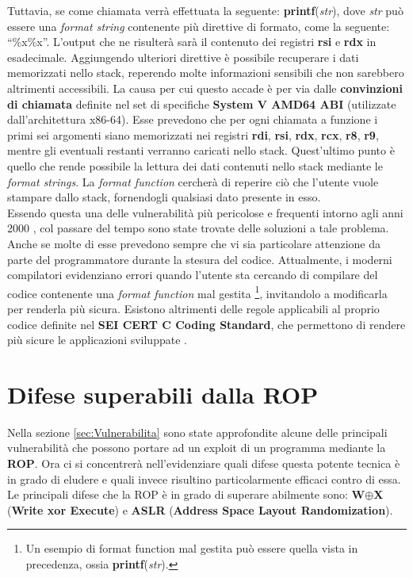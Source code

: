 Tuttavia, se come chiamata verrà effettuata la seguente: \textbf{printf}(\textit{str}), dove \textit{str} può essere una \textit{format string} contenente più direttive di formato, come la seguente: ``\%x\%x''. L'output che ne risulterà sarà il contenuto dei registri \textbf{rsi} e \textbf{rdx} in esadecimale. Aggiungendo ulteriori direttive è possibile recuperare i dati 
memorizzati nello stack, reperendo molte informazioni sensibili che non sarebbero altrimenti accessibili. La causa per cui questo accade è per via dalle \textbf{convinzioni di chiamata}\label{call-convention} definite nel set di specifiche \textbf{System V AMD64 ABI} \cite*{AMD64-ABI} (utilizzate dall'architettura x86-64). Esse prevedono che per ogni chiamata 
a funzione i primi sei argomenti siano memorizzati nei registri \textbf{rdi}, \textbf{rsi}, \textbf{rdx}, \textbf{rcx}, \textbf{r8}, \textbf{r9}, mentre gli eventuali restanti verranno caricati nello stack. Quest'ultimo punto è quello che rende possibile la lettura dei dati contenuti nello stack mediante le \textit{format strings}. La \textit{format function}
cercherà di reperire ciò che l'utente vuole stampare dallo stack, fornendogli qualsiasi dato presente in esso.\\
Essendo questa una delle vulnerabilità più pericolose e frequenti intorno agli anni 2000 \cite*{Formatstring}, col passare del tempo sono state trovate delle soluzioni a tale problema. Anche se molte di esse prevedono sempre che vi sia particolare attenzione da parte del programmatore durante la stesura del codice.
Attualmente, i moderni compilatori evidenziano errori quando l'utente sta cercando di compilare del codice contenente una \textit{format function} mal gestita \footnote[1]{Un esempio di format function mal gestita può essere quella vista in precedenza, ossia \textbf{printf}(\textit{str}).}, invitandolo a modificarla per renderla più sicura.
Esistono altrimenti delle regole applicabili al proprio codice definite nel \textbf{SEI CERT C Coding Standard}, che permettono di rendere più sicure le applicazioni sviluppate \cite*{SEI-CERT-RULE09}.

\section{Difese superabili dalla ROP}
\label{sec:Def-bypass}
Nella sezione \ref{sec:Vulnerabilita} sono state approfondite alcune delle principali vulnerabilità che possono portare ad un exploit di un programma mediante la \textbf{ROP}. Ora ci si concentrerà nell'evidenziare quali difese questa potente tecnica è in grado di eludere e quali invece risultino particolarmente efficaci contro di essa.\\
Le principali difese che la ROP è in grado di superare abilmente sono: \textbf{W$\oplus$X} (\textbf{Write  xor Execute}) e \textbf{ASLR} (\textbf{Address Space Layout Randomization}).


